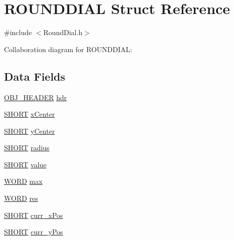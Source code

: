 \hypertarget{struct_r_o_u_n_d_d_i_a_l}{}\section{R\+O\+U\+N\+D\+D\+I\+A\+L Struct Reference}
\label{struct_r_o_u_n_d_d_i_a_l}


{\ttfamily \#include $<$Round\+Dial.\+h$>$}



Collaboration diagram for R\+O\+U\+N\+D\+D\+I\+A\+L\+:
\subsection*{Data Fields}
\begin{DoxyCompactItemize}
\item 
\hyperlink{struct_o_b_j___h_e_a_d_e_r}{O\+B\+J\+\_\+\+H\+E\+A\+D\+E\+R} \hyperlink{struct_r_o_u_n_d_d_i_a_l_abeffaf353197a8a64fba6707b68ce0be}{hdr}
\item 
\hyperlink{_generic_type_defs_8h_ae9bb25d3afecf3bfab0fbe3c22c2050f}{S\+H\+O\+R\+T} \hyperlink{struct_r_o_u_n_d_d_i_a_l_aea1d1e18200cb2a91fcd74c6e1172ba8}{x\+Center}
\item 
\hyperlink{_generic_type_defs_8h_ae9bb25d3afecf3bfab0fbe3c22c2050f}{S\+H\+O\+R\+T} \hyperlink{struct_r_o_u_n_d_d_i_a_l_aeb7c9f7af073c797530bda5b0989e239}{y\+Center}
\item 
\hyperlink{_generic_type_defs_8h_ae9bb25d3afecf3bfab0fbe3c22c2050f}{S\+H\+O\+R\+T} \hyperlink{struct_r_o_u_n_d_d_i_a_l_ae5bf5300978dec1b6c69ee537e1c98f8}{radius}
\item 
\hyperlink{_generic_type_defs_8h_ae9bb25d3afecf3bfab0fbe3c22c2050f}{S\+H\+O\+R\+T} \hyperlink{struct_r_o_u_n_d_d_i_a_l_ac4d3490391236691d132e3085e887474}{value}
\item 
\hyperlink{_generic_type_defs_8h_a2b0e863dadf920709ec53d9088ee7c91}{W\+O\+R\+D} \hyperlink{struct_r_o_u_n_d_d_i_a_l_ada9062a8cfa28dadad3430074dcb167e}{max}
\item 
\hyperlink{_generic_type_defs_8h_a2b0e863dadf920709ec53d9088ee7c91}{W\+O\+R\+D} \hyperlink{struct_r_o_u_n_d_d_i_a_l_a1d4f80e34e247c9f341f610949618958}{res}
\item 
\hyperlink{_generic_type_defs_8h_ae9bb25d3afecf3bfab0fbe3c22c2050f}{S\+H\+O\+R\+T} \hyperlink{struct_r_o_u_n_d_d_i_a_l_a2cd7ce648be49a7f48c6cb087749a186}{curr\+\_\+x\+Pos}
\item 
\hyperlink{_generic_type_defs_8h_ae9bb25d3afecf3bfab0fbe3c22c2050f}{S\+H\+O\+R\+T} \hyperlink{struct_r_o_u_n_d_d_i_a_l_a8d43efe8256594d13ee57c7b252d2ebb}{curr\+\_\+y\+Pos}

\end{DoxyCompactItemize}
